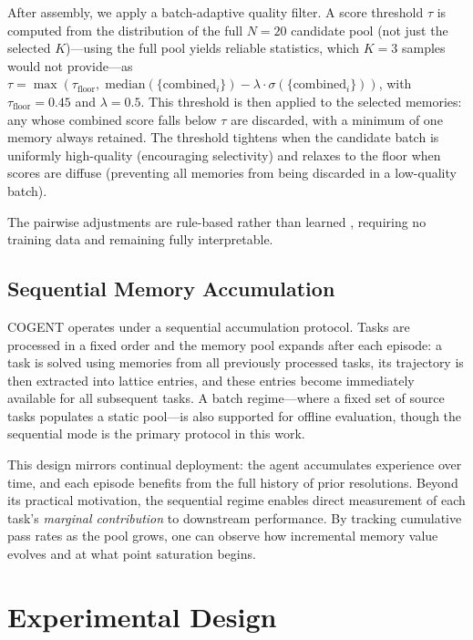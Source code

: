 \documentclass[letterpaper]{article} %
\begin{document}
After assembly, we apply a batch-adaptive quality filter. A score threshold $\tau$ is computed from the distribution of the full $N=20$ candidate pool (not just the selected $K$)---using the full pool yields reliable statistics, which $K=3$ samples would not provide---as $\tau = \max(\tau_{\text{floor}},\; \text{median}(\{\text{combined}_i\}) - \lambda \cdot \sigma(\{\text{combined}_i\}))$, with $\tau_{\text{floor}} = 0.45$ and $\lambda = 0.5$. This threshold is then applied to the selected memories: any whose combined score falls below $\tau$ are discarded, with a minimum of one memory always retained. The threshold tightens when the candidate batch is uniformly high-quality (encouraging selectivity) and relaxes to the floor when scores are diffuse (preventing all memories from being discarded in a low-quality batch).

The pairwise adjustments are rule-based rather than learned \cite{context-picker, memfly}, requiring no training data and remaining fully interpretable.

\subsection{Sequential Memory Accumulation}
\label{sec:pool}

\textsc{COGENT} operates under a sequential accumulation protocol. Tasks are processed in a fixed order and the memory pool expands after each episode: a task is solved using memories from all previously processed tasks, its trajectory is then extracted into lattice entries, and these entries become immediately available for all subsequent tasks. A batch regime---where a fixed set of source tasks populates a static pool---is also supported for offline evaluation, though the sequential mode is the primary protocol in this work.

This design mirrors continual deployment: the agent accumulates experience over time, and each episode benefits from the full history of prior resolutions. Beyond its practical motivation, the sequential regime enables direct measurement of each task's \emph{marginal contribution} to downstream performance. By tracking cumulative pass rates as the pool grows, one can observe how incremental memory value evolves and at what point saturation begins.

\section{Experimental Design}
\end{document}
